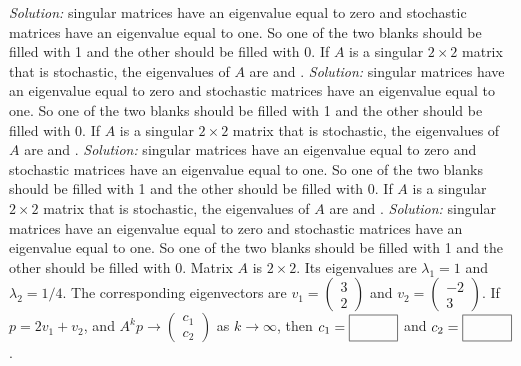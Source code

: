 \begin{parts}
        \ifnum {} {\color{DarkBlue} \textit{Solution:} singular matrices have an eigenvalue equal to zero and stochastic matrices have an eigenvalue equal to one. So one of the two blanks should be filled with 1 and the other should be filled with 0. } \fi     
    \fi 
    \ifnum {}
        If $A$ is a singular $2\times 2$ matrix that is stochastic, the eigenvalues of $A$ are \framebox{\strut\hspace{1cm}} and \framebox{\strut\hspace{1cm}}. 
        \ifnum {} {\color{DarkBlue} \textit{Solution:} singular matrices have an eigenvalue equal to zero and stochastic matrices have an eigenvalue equal to one. So one of the two blanks should be filled with 1 and the other should be filled with 0. } \fi  
    \fi 
    \ifnum {}
        If $A$ is a singular $2\times 2$ matrix that is stochastic, the eigenvalues of $A$ are \framebox{\strut\hspace{1cm}} and \framebox{\strut\hspace{1cm}}. 
        \ifnum {} {\color{DarkBlue} \textit{Solution:} singular matrices have an eigenvalue equal to zero and stochastic matrices have an eigenvalue equal to one. So one of the two blanks should be filled with 1 and the other should be filled with 0. } \fi  
    \fi 
    \ifnum {}
        If $A$ is a singular $2\times 2$ matrix that is stochastic, the eigenvalues of $A$ are \framebox{\strut\hspace{1cm}} and \framebox{\strut\hspace{1cm}}. 
        \ifnum {} {\color{DarkBlue} \textit{Solution:} singular matrices have an eigenvalue equal to zero and stochastic matrices have an eigenvalue equal to one. So one of the two blanks should be filled with 1 and the other should be filled with 0. } \fi  
    \fi 
    \ifnum {}
        Matrix $A$ is $2\times 2$. Its eigenvalues are $\lambda_1 = 1$ and $\lambda_2= 1/4$. The corresponding eigenvectors are $v_1 = \begin{pmatrix} 3\\2\end{pmatrix}$ and $v_2=\begin{pmatrix} -2\\3\end{pmatrix}$. If $ p = 2v_1+v_2$, and $A^kp \to \begin{pmatrix} c_1 \\ c_2 \end{pmatrix}$ as $k\to \infty$, then $c_1 = \framebox{\strut\hspace{1cm}}$ and $c_2 = \framebox{\strut\hspace{1cm}}$. 
        

\end{parts}

